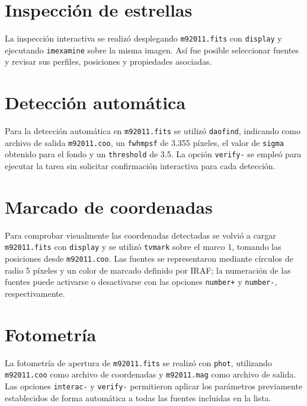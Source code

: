 \documentclass[12pt,letterpaper,oneside]{book}
\begin{document}

\section{Inspección de estrellas}

La inspección interactiva se realizó desplegando \texttt{m92011.fits} con \texttt{display} y ejecutando \texttt{imexamine} sobre la misma imagen. Así fue posible seleccionar fuentes y revisar sus perfiles, posiciones y propiedades asociadas.



\section{Detección automática}

Para la detección automática en \texttt{m92011.fits} se utilizó \texttt{daofind}, indicando como archivo de salida \texttt{m92011.coo}, un \texttt{fwhmpsf} de 3.355 píxeles, el valor de \texttt{sigma} obtenido para el fondo y un \texttt{threshold} de 3.5. La opción \texttt{verify-} se empleó para ejecutar la tarea sin solicitar confirmación interactiva para cada detección.



\section{Marcado de coordenadas}

Para comprobar visualmente las coordenadas detectadas se volvió a cargar \texttt{m92011.fits} con \texttt{display} y se utilizó \texttt{tvmark} sobre el marco 1, tomando las posiciones desde \texttt{m92011.coo}. Las fuentes se representaron mediante círculos de radio 5 píxeles y un color de marcado definido por IRAF; la numeración de las fuentes puede activarse o desactivarse con las opciones \texttt{number+} y \texttt{number-}, respectivamente.



\section{Fotometría}

La fotometría de apertura de \texttt{m92011.fits} se realizó con \texttt{phot}, utilizando \texttt{m92011.coo} como archivo de coordenadas y \texttt{m92011.mag} como archivo de salida. Las opciones \texttt{interac-} y \texttt{verify-} permitieron aplicar los parámetros previamente establecidos de forma automática a todas las fuentes incluidas en la lista.
\end{document}
